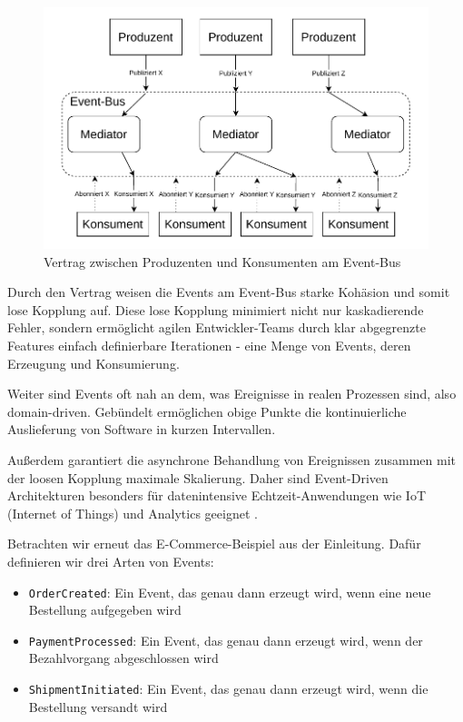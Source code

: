 \documentclass[acmtog]{acmart}
\begin{document}
\begin{figure}[!h]
  \centering
  \includegraphics[width=\linewidth]{images/eda/eda.drawio}
  \caption{Vertrag zwischen Produzenten und Konsumenten am Event-Bus}
  \label{fig:eda}
\end{figure}

Durch den Vertrag weisen die Events am Event-Bus starke Kohäsion und somit lose Kopplung auf.
Diese lose Kopplung minimiert nicht nur kaskadierende Fehler, sondern ermöglicht agilen Entwickler-Teams durch klar abgegrenzte Features einfach definierbare Iterationen
- eine Menge von Events, deren Erzeugung und Konsumierung.

Weiter sind Events oft nah an dem, was Ereignisse in realen Prozessen sind, also domain-driven.
Gebündelt ermöglichen obige Punkte die kontinuierliche Auslieferung von Software in kurzen Intervallen.

Außerdem garantiert die asynchrone Behandlung von Ereignissen zusammen mit der loosen Kopplung maximale Skalierung.
Daher sind Event-Driven Architekturen besonders für datenintensive Echtzeit-Anwendungen wie IoT (Internet of Things) und Analytics geeignet \cite{iotEda}.

Betrachten wir erneut das E-Commerce-Beispiel aus der Einleitung.
Dafür definieren wir drei Arten von Events:
\begin{itemize}
  \item \texttt{OrderCreated}: Ein Event, das genau dann erzeugt wird, wenn eine neue Bestellung aufgegeben wird
  \item \texttt{PaymentProcessed}: Ein Event, das genau dann erzeugt wird, wenn der Bezahlvorgang abgeschlossen wird
  \item \texttt{ShipmentInitiated}: Ein Event, das genau dann erzeugt wird, wenn die Bestellung versandt wird
\end{itemize}
\end{document}
